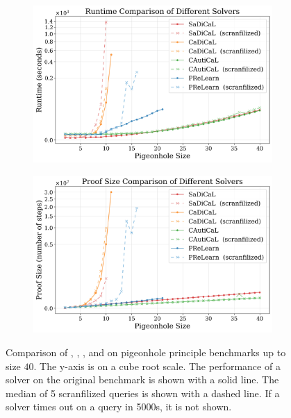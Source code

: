 \begin{figure}[!t]
    \centering
    \begin{subfigure}[t]{0.4\textwidth}
        \centering
        \includegraphics[width=\textwidth]{figs/pigeonhole_runtime_comparison.jpg}
        \label{fig:pigeonhole-runtime-comparison}
    \end{subfigure}
    \hspace{0.06\textwidth}
    \begin{subfigure}[t]{0.4\textwidth}
        \centering
        \includegraphics[width=\textwidth]{figs/pigeonhole_proof_size_comparison.jpg}
        \label{fig:pigeonhole-proof-size-comparison}
    \end{subfigure}
    \caption{Comparison of \tool, \cadical, \sadical, and \prelearn on pigeonhole principle benchmarks up to size $40$. The y-axis is on a cube root scale. The performance of a solver on the original benchmark is shown with a solid line. The median of 5 scranfilized queries is shown with a dashed line. If a solver times out on a query in 5000s, it is not shown.}
    \label{fig:pigeonhole-results}
\end{figure}


